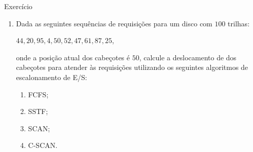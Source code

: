 
\begin{frame}{Exercício}

  \begin{enumerate}
  \item Dada as seguintes sequências de requisições para um 
    disco com $100$ trilhas:
    \begin{center}
      $44, 20, 95, 4, 50, 52, 47, 61, 87, 25$,
    \end{center}
    onde a posição atual dos cabeçotes é $50$, calcule a deslocamento
    de dos cabeçotes para atender às requisições utilizando os
    seguintes algoritmos de escalonamento de E/S:
    \begin{enumerate}
    \item FCFS;
    \item SSTF;
    \item SCAN;
    \item C-SCAN.
    \end{enumerate}
  \end{enumerate}
  
\end{frame}


